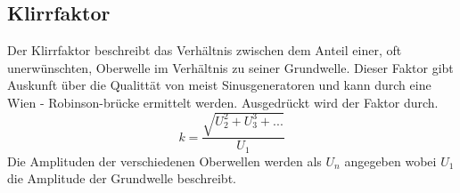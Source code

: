 \subsection{Klirrfaktor}
Der Klirrfaktor beschreibt das Verhältnis zwischen dem Anteil einer, oft unerwünschten, Oberwelle im Verhältnis zu seiner Grundwelle.
Dieser Faktor gibt Auskunft über die Qualittät von meist Sinusgeneratoren und kann durch eine Wien - Robinson-brücke ermittelt werden.
Ausgedrückt wird der Faktor durch.
\begin{equation}
    \label{eqn:GlasGoesklirr}   
    k = \frac{\sqrt{U_2^2+U_3^3+...}}{U_1}
\end{equation}
Die Amplituden der verschiedenen Oberwellen werden als $U_n$ angegeben wobei $U_1$ die Amplitude der Grundwelle beschreibt.














